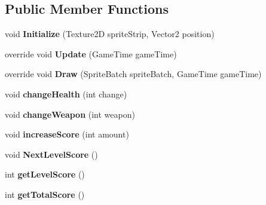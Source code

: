 \subsection*{Public Member Functions}
\begin{DoxyCompactItemize}
\item 
\hypertarget{class_tile_engine_1_1_player_a40932b9bf69a88c42467a2fb2a8e5255}{void {\bfseries Initialize} (Texture2\-D sprite\-Strip, Vector2 position)}\label{class_tile_engine_1_1_player_a40932b9bf69a88c42467a2fb2a8e5255}

\item 
\hypertarget{class_tile_engine_1_1_player_add7b752fcd9f9cb94302c577f8088528}{override void {\bfseries Update} (Game\-Time game\-Time)}\label{class_tile_engine_1_1_player_add7b752fcd9f9cb94302c577f8088528}

\item 
\hypertarget{class_tile_engine_1_1_player_a3150892fc641203e9bfee6b21a202ce5}{override void {\bfseries Draw} (Sprite\-Batch sprite\-Batch, Game\-Time game\-Time)}\label{class_tile_engine_1_1_player_a3150892fc641203e9bfee6b21a202ce5}

\item 
\hypertarget{class_tile_engine_1_1_player_a1f2e40accd441a1bbd6e213af5fb5314}{void {\bfseries change\-Health} (int change)}\label{class_tile_engine_1_1_player_a1f2e40accd441a1bbd6e213af5fb5314}

\item 
\hypertarget{class_tile_engine_1_1_player_abf7f40e5c53bad024c041f21e0a754f2}{void {\bfseries change\-Weapon} (int weapon)}\label{class_tile_engine_1_1_player_abf7f40e5c53bad024c041f21e0a754f2}

\item 
\hypertarget{class_tile_engine_1_1_player_aec85e347f9cf381981efb1f9590741df}{void {\bfseries increase\-Score} (int amount)}\label{class_tile_engine_1_1_player_aec85e347f9cf381981efb1f9590741df}

\item 
\hypertarget{class_tile_engine_1_1_player_ae8bca588776c05e074fb753eeb7e86c9}{void {\bfseries Next\-Level\-Score} ()}\label{class_tile_engine_1_1_player_ae8bca588776c05e074fb753eeb7e86c9}

\item 
\hypertarget{class_tile_engine_1_1_player_a343a9468c20e6c140ef23653cd70b942}{int {\bfseries get\-Level\-Score} ()}\label{class_tile_engine_1_1_player_a343a9468c20e6c140ef23653cd70b942}

\item 
\hypertarget{class_tile_engine_1_1_player_a927b46fb75a886e2429ff853261e71a1}{int {\bfseries get\-Total\-Score} ()}\label{class_tile_engine_1_1_player_a927b46fb75a886e2429ff853261e71a1}


\end{DoxyCompactItemize}
